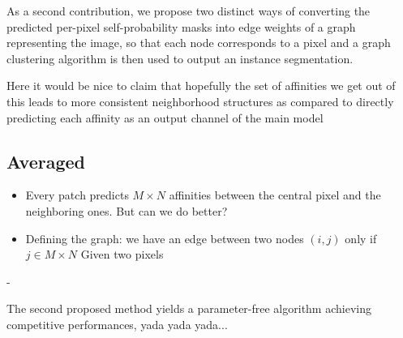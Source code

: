 As a second contribution, we propose two distinct ways of converting the predicted per-pixel self-probability masks into edge weights of a graph representing the image, so that each node corresponds to a pixel and a graph clustering algorithm is then used to output an instance segmentation.

Here it would be nice to claim that hopefully the set of affinities we get out of this leads to more consistent neighborhood structures as compared to directly predicting each affinity as an output channel of the main model

\subsection{Averaged }\label{sec:prob_affs}
\begin{itemize}
\item Every patch predicts $M\times N$ affinities between the central pixel and the neighboring ones. But can we do better?
\item Defining the graph: we have an edge between two nodes $(i, j)$ only if $j \in M\times N$ Given two pixels  
\end{itemize}
- 


The second proposed method yields a parameter-free algorithm achieving competitive performances, yada yada yada... 

